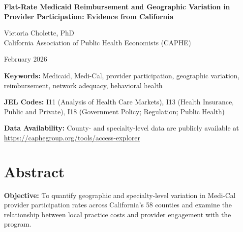\documentclass[12pt]{article}
\begin{document}

\begin{center}
\vspace*{1cm}

{\LARGE\bfseries Flat-Rate Medicaid Reimbursement and Geographic Variation in Provider Participation: Evidence from California}

\vspace{1.5cm}

{\large Victoria Cholette, PhD}\\[0.3cm]
California Association of Public Health Economists (CAPHE)

\vspace{1cm}

February 2026

\vspace{1cm}

\textbf{Keywords:} Medicaid, Medi-Cal, provider participation, geographic variation, reimbursement, network adequacy, behavioral health

\vspace{0.5cm}

\textbf{JEL Codes:} I11 (Analysis of Health Care Markets), I13 (Health Insurance, Public and Private), I18 (Government Policy; Regulation; Public Health)

\vspace{0.5cm}

\textbf{Data Availability:} County- and specialty-level data are publicly available at\\ \url{https://caphegroup.org/tools/access-explorer}

\end{center}

\thispagestyle{empty}
\newpage


\section*{Abstract}

\textbf{Objective:} To quantify geographic and specialty-level variation in Medi-Cal provider participation rates across California's 58 counties and examine the relationship between local practice costs and provider engagement with the program.
\end{document}
